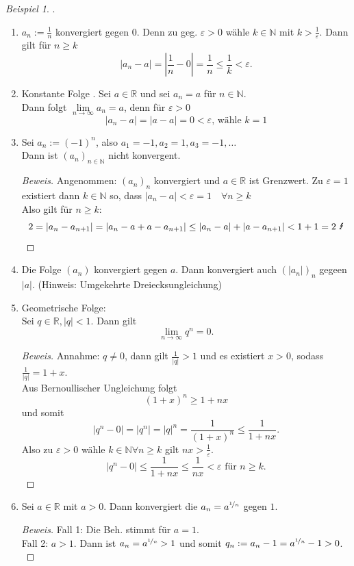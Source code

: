 \documentclass[12pt,a4paper,titlepage]{article} %
\theoremstyle{definition}
\theoremstyle{remark}
\newtheorem*{bsp}{Beispiel}
\newenvironment{bew}{\begin{proof}[Beweis]}{\end{proof}}
\newcommand{\N}{\mathbb{N}}
\newcommand{\R}{\mathbb{R}}
\newcommand{\limes}[1]{\lim\limits_{#1\rightarrow\infty}}
\begin{document}
\begin{bsp}. %
	\begin{enumerate}
		\item $a_n := \frac{1}{n}$ konvergiert gegen $0$. Denn zu geg. $\varepsilon>0$ wähle $k\in\N$ mit $k>\frac{1}{\varepsilon}$. Dann gilt für $n\geq k$
		$$|a_n-a| = |\frac{1}{n} - 0| = \frac{1}{n} \leq \frac{1}{k} < \varepsilon.$$
		\item Konstante Folge . Sei $a\in\R$ und sei $a_n = a$ für $n\in\N$.\\
		Dann folgt $\limes{n} a_n = a$, denn für $\varepsilon > 0$
		$$|a_n - a| = |a-a|=0<\varepsilon \text{, wähle } k=1$$
		\item Sei $a_n := (-1)^n$, also $a_1 = -1, a_2 = 1, a_3 = -1, \ldots$\\
		Dann ist $(a_n)_{n\in\N}$ nicht konvergent.
		\begin{bew}
			Angenommen: $(a_n)_n$ konvergiert und $a\in\R$ ist Grenzwert. Zu $\varepsilon = 1$ existiert dann $k\in\N$ so, dass $|a_n - a| < \varepsilon = 1 \quad \forall n\geq k$\\
			Also gilt für $n\geq k$:
			$$2 = |a_n - a_{n+1}| = |a_n - a + a - a_{n+1}| \leq |a_n - a| + |a-a_{n+1}| < 1 + 1 = 2 \text{ \Lightning}$$
		\end{bew}
		\item Die Folge $(a_n)$ konvergiert gegen $a$. Dann konvergiert auch $(|a_n|)_n$ gegeen $|a|$. (Hinweis: Umgekehrte Dreiecksungleichung)
		\item Geometrische Folge:\\
		Sei $q\in\R, |q|<1$. Dann gilt
		$$\limes{n} q^n = 0.$$
		\begin{bew}
			Annahme: $q\neq 0$, dann gilt $\frac{1}{|q|}>1$ und es existiert $x>0$, sodass $\frac{1}{|q|} = 1 + x$.\\
			Aus Bernoullischer Ungleichung folgt $$(1+x)^n \geq 1+nx$$ und somit $$|q^n-0| = |q^n| = |q|^n = \frac{1}{(1+x)^n} \leq \frac{1}{1+nx}.$$
			Also zu $\varepsilon > 0$ wähle $k\in\N \forall n\geq k$ gilt $nx > \frac{1}{\varepsilon}$.
			$$|q^n-0|\leq \frac{1}{1+nx} \leq \frac{1}{nx} < \varepsilon \text{ für } n\geq k.$$
		\end{bew}
		\item Sei $a\in\R$ mit $a>0$. Dann konvergiert die $a_n = a^{\nicefrac{1}{n}}$ gegen $1$.
		\begin{bew}
			Fall 1: Die Beh. stimmt für $a=1$.\\
			Fall 2: $a>1$. Dann ist $a_n = a^{\nicefrac{1}{n}}>1$ und somit $q_n := a_n-1 = a^{\nicefrac{1}{n}} -1 >0$.\\

\end{bew}
\end{enumerate}
\end{bsp}
\end{document}
